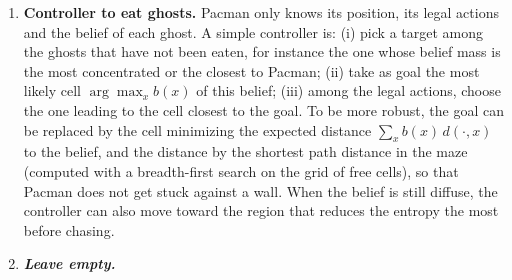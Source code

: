 \documentclass{article}
\begin{document}
\begin{enumerate}[label=\alph*.,leftmargin=*]
    \item \textbf{Controller to eat ghosts.}
    Pacman only knows its position, its legal actions and the belief of each
    ghost. A simple controller is: (i) pick a target among the ghosts that have
    not been eaten, for instance the one whose belief mass is the most
    concentrated or the closest to Pacman; (ii) take as goal the most likely cell
    $\arg\max_x b(x)$ of this belief; (iii) among the legal actions,
    choose the one leading to the cell closest to the goal. To be more robust, the
    goal can be replaced by the cell minimizing the expected distance
    $\sum_x b(x)\,d(\cdot,x)$ to the belief, and the distance by the
    shortest path distance in the maze (computed with a breadth-first search on
    the grid of free cells), so that Pacman does not get stuck against a wall.
    When the belief is still diffuse, the controller can also move toward the
    region that reduces the entropy the most before chasing.

    \item \textbf{\textit{Leave empty.}}
\end{enumerate}

\end{document}
